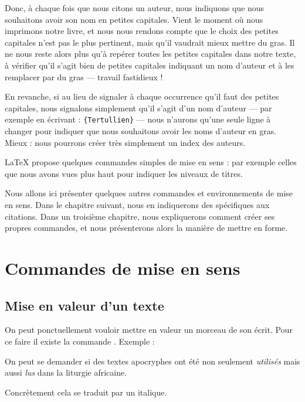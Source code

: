 Donc, à chaque fois que nous citons un auteur, nous indiquons que nous souhaitons avoir son nom en petites capitales.
Vient le moment où nous imprimons notre livre, et nous nous rendons compte que le choix des petites capitales n'est pas le plus pertinent, mais qu'il vaudrait mieux mettre du gras. Il ne nous reste alors plus qu'à repérer toutes les petites capitales dans notre texte, à vérifier qu'il s'agit bien de petites capitales indiquant un nom d'auteur et à les remplacer par du gras --- travail fastidieux !

En revanche, si au lieu de signaler à chaque occurrence qu'il faut des petites capitales, nous signalons simplement  qu'il s'agit d'un nom d'auteur --- par exemple en écrivant : \verb|{Tertullien}| --- nous n'aurons qu'une seule ligne à changer pour indiquer que nous souhaitons avoir les noms d'auteur en gras. Mieux : nous pourrons créer très simplement un index des auteurs.

LaTeX propose quelques commandes simples de mise en sens  : par exemple celles que nous avons vues plus haut pour indiquer les niveaux de titres.

Nous allons ici présenter quelques autres commandes et environnements de mise en sens. Dans le chapitre suivant, nous en indiquerons des spécifiques aux citations. Dans un troisième chapitre, nous expliquerons comment créer ses propres commandes, et nous présenterons alors la manière de mettre en forme.

\section{Commandes de mise en sens}

\subsection{Mise en valeur d'un texte}

On peut ponctuellement vouloir mettre en valeur un morceau de son écrit. Pour ce faire il existe la commande .
Exemple :

\begin{latexcode}
On peut se demander si des textes apocryphes 
ont été non seulement \emph{utilisés} mais aussi \emph{lus}
dans la liturgie africaine.
\end{latexcode}

Concrètement cela se traduit par un italique. 

